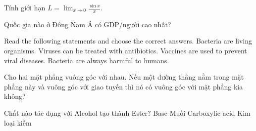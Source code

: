 \begin{ex}
    Tính giới hạn $L = \lim_{x \to 0} \frac{\sin x}{x}$.
\end{ex}
\begin{ex}
    Quốc gia nào ở Đông Nam Á có GDP/người cao nhất?
\end{ex}
\begin{ex}
    Read the following statements and choose the correct answers.
    \choiceTF
    {\True Bacteria are living organisms.}
    {Viruses can be treated with antibiotics.}
    {\True Vaccines are used to prevent viral diseases.}
    {Bacteria are always harmful to humans.}
\end{ex}
\begin{ex}
    Cho hai mặt phẳng vuông góc với nhau. Nếu một đường thẳng nằm trong mặt phẳng này và vuông góc với giao tuyến thì nó có vuông góc với mặt phẳng kia không?
\end{ex}
\begin{ex}
    Chất nào tác dụng với Alcohol tạo thành Ester?
    \choice
    {Base}
    {Muối}
    {\True Carboxylic acid}
    {Kim loại kiềm}
\end{ex}
